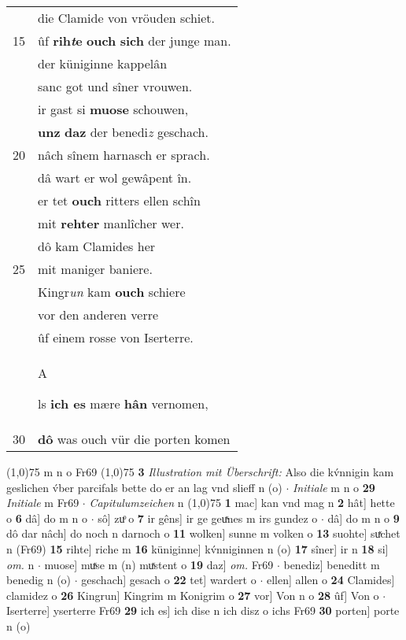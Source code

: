 \documentclass[8pt,a4paper,notitlepage]{article}
\begin{document}
\begin{table}[ht]
\begin{minipage}[t]{0.5\linewidth}
\begin{tabular}{rl}
 & die Clamide von vröuden schiet.\\ 
15 & ûf \textbf{rih\textit{t}e} \textbf{ouch} \textbf{sich} der junge man.\\ 
 & der küniginne kappelân\\ 
 & sanc got und sîner vrouwen.\\ 
 & ir gast si \textbf{muose} schouwen,\\ 
 & \textbf{unz} \textbf{daz} der benedi\textit{z} geschach.\\ 
20 & nâch sînem harnasch er sprach.\\ 
 & dâ wart er wol gewâpent în.\\ 
 & er tet \textbf{ouch} ritters ellen schîn\\ 
 & mit \textbf{rehter} manlîcher wer.\\ 
 & dô kam Clamides her\\ 
25 & mit maniger baniere.\\ 
 & Kingr\textit{un} kam \textbf{ouch} schiere\\ 
 & vor den anderen verre\\ 
 & ûf einem rosse von Iserterre.\\ 
 & \begin{large}A\end{large}ls \textbf{ich es} mære \textbf{hân} vernomen,\\ 
30 & \textbf{dô} was ouch vür die porten komen\\ 
\end{tabular}
\scriptsize
\line(1,0){75} \newline
m n o Fr69 \newline
\line(1,0){75} \newline
\textbf{3} \textit{Illustration mit Überschrift:} Also die kv́nnigin kam geslichen v́ber parcifals bette do er an lag vnd slieff n (o)   $\cdot$ \textit{Initiale} m n o  \textbf{29} \textit{Initiale} m Fr69   $\cdot$ \textit{Capitulumzeichen} n  \newline
\line(1,0){75} \newline
\textbf{1} mac] kan vnd mag n \textbf{2} hât] hette o \textbf{6} dâ] do m n o  $\cdot$ sô] zuͦ o \textbf{7} ir gêns] ir ge geuͯnes m irs gundez o  $\cdot$ dâ] do m n o \textbf{9} dô dar nâch] do noch n darnoch o \textbf{11} wolken] sunne m volken o \textbf{13} suohte] suͯchet n (Fr69) \textbf{15} rihte] riche m \textbf{16} küniginne] kv́nniginnen n (o) \textbf{17} sîner] ir n \textbf{18} si] \textit{om.} n  $\cdot$ muose] muͯse m (n) muͯstent o \textbf{19} daz] \textit{om.} Fr69  $\cdot$ benediz] beneditt m benedig n (o)  $\cdot$ geschach] gesach o \textbf{22} tet] wardert o  $\cdot$ ellen] allen o \textbf{24} Clamides] clamidez o \textbf{26} Kingrun] Kingrim m Konigrim o \textbf{27} vor] Von n o \textbf{28} ûf] Von o  $\cdot$ Iserterre] yserterre Fr69 \textbf{29} ich es] ich dise n ich disz o ichs Fr69 \textbf{30} porten] porte n (o) \newline
\end{minipage}
\end{table}
\end{document}
